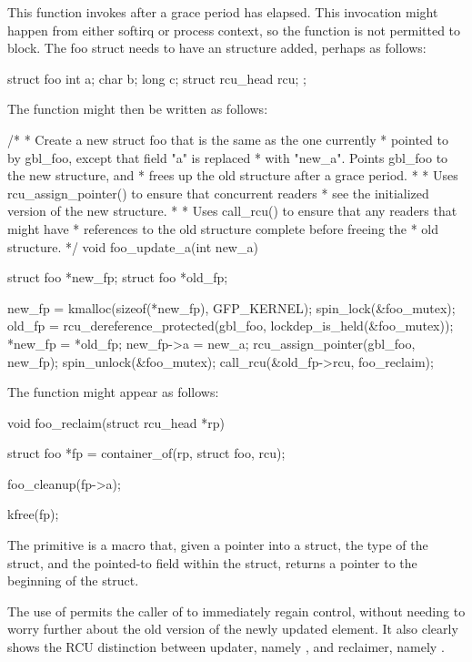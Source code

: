 This function invokes  after a grace period has elapsed.
This invocation might happen from either softirq or process context,
so the function is not permitted to block.
The foo struct needs to
have an  structure added, perhaps as follows:

\begin{VerbatimU}
	struct foo {
		int a;
		char b;
		long c;
		struct rcu_head rcu;
	};
\end{VerbatimU}

The  function might then be written as follows:

\begin{VerbatimU}[samepage=false,breaklines=true]
	/*
	 * Create a new struct foo that is the same as the one currently
	 * pointed to by gbl_foo, except that field "a" is replaced
	 * with "new_a".  Points gbl_foo to the new structure, and
	 * frees up the old structure after a grace period.
	 *
	 * Uses rcu_assign_pointer() to ensure that concurrent readers
	 * see the initialized version of the new structure.
	 *
	 * Uses call_rcu() to ensure that any readers that might have
	 * references to the old structure complete before freeing the
	 * old structure.
	 */
	void foo_update_a(int new_a)
	{
		struct foo *new_fp;
		struct foo *old_fp;

		new_fp = kmalloc(sizeof(*new_fp), GFP_KERNEL);
		spin_lock(&foo_mutex);
		old_fp = rcu_dereference_protected(gbl_foo, lockdep_is_held(&foo_mutex));
		*new_fp = *old_fp;
		new_fp->a = new_a;
		rcu_assign_pointer(gbl_foo, new_fp);
		spin_unlock(&foo_mutex);
		call_rcu(&old_fp->rcu, foo_reclaim);
	}
\end{VerbatimU}

The  function might appear as follows:

\begin{VerbatimU}
	void foo_reclaim(struct rcu_head *rp)
	{
		struct foo *fp = container_of(rp, struct foo, rcu);

		foo_cleanup(fp->a);

		kfree(fp);
	}
\end{VerbatimU}

The  primitive is a macro that, given a pointer into a
struct, the type of the struct, and the pointed-to field within the
struct, returns a pointer to the beginning of the struct.

The use of  permits the caller of  to
immediately regain control, without needing to worry further about the
old version of the newly updated element.
It also clearly shows the
RCU distinction between updater, namely , and reclaimer,
namely .

